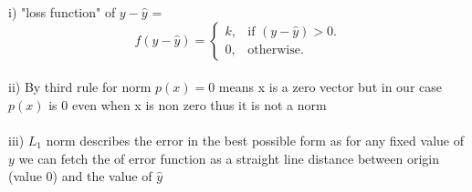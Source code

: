 \documentclass[english]{article}
\begin{document}
\begin{enumerate}
i) "loss function" of $y - \hat{y}$ =  \\
\begin{equation}
  f(y - \hat{y})=\begin{cases}
    k, & \text{if $(y - \hat{y})>0$}.\\
    0, & \text{otherwise}.
  \end{cases}
\end{equation} \\
ii) By third rule for norm $p(x) = 0$ means x is a zero vector but in our case $p(x)$ is 0 even when x is non zero thus it is not a norm \\ \\
iii) $L_1$ norm describes the error in the best possible form as for any fixed value of $y$ we can fetch the of error function as a straight line distance between origin (value 0) and the value of $\hat{y}$ \\
\end{enumerate}
\end{document}
